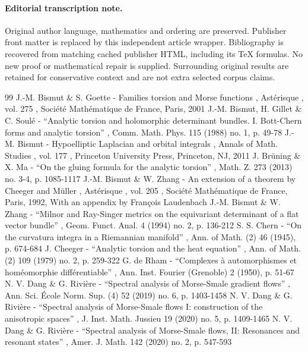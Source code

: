 \documentclass[11pt]{article}
\numberwithin{equation}{section}
\begin{document}
\paragraph{Editorial transcription note.}
Original author language, mathematics and ordering are preserved. Publisher front matter is replaced by this independent article wrapper. Bibliography is recovered from matching cached publisher HTML, including its TeX formulas. No new proof or mathematical repair is supplied. Surrounding original results are retained for conservative context and are not extra selected corpus claims.
\clearpage

\begin{thebibliography}{99}
 J.-M. Bismut \& S. Goette - Families torsion and Morse functions , Astérisque , vol. 275 , Société Mathématique de France, Paris, 2001
 J.-M. Bismut, H. Gillet \& C. Soulé - “Analytic torsion and holomorphic determinant bundles. I. Bott-Chern forms and analytic torsion” , Comm. Math. Phys. 115 (1988) no. 1, p. 49-78
 J.-M. Bismut - Hypoelliptic Laplacian and orbital integrals , Annals of Math. Studies , vol. 177 , Princeton University Press, Princeton, NJ, 2011
 J. Brüning \& X. Ma - “On the gluing formula for the analytic torsion” , Math. Z. 273 (2013) no. 3-4, p. 1085-1117
 J.-M. Bismut \& W. Zhang - An extension of a theorem by Cheeger and Müller , Astérisque , vol. 205 , Société Mathématique de France, Paris, 1992, With an appendix by François Laudenbach
 J.-M. Bismut \& W. Zhang - “Milnor and Ray-Singer metrics on the equivariant determinant of a flat vector bundle” , Geom. Funct. Anal. 4 (1994) no. 2, p. 136-212
 S. S. Chern - “On the curvatura integra in a Riemannian manifold” , Ann. of Math. (2) 46 (1945), p. 674-684
 J. Cheeger - “Analytic torsion and the heat equation” , Ann. of Math. (2) 109 (1979) no. 2, p. 259-322
 G. de Rham - “Complexes à automorphismes et homéomorphie différentiable” , Ann. Inst. Fourier (Grenoble) 2 (1950), p. 51-67
 N. V. Dang \& G. Rivière - “Spectral analysis of Morse-Smale gradient flows” , Ann. Sci. École Norm. Sup. (4) 52 (2019) no. 6, p. 1403-1458
 N. V. Dang \& G. Rivière - “Spectral analysis of Morse-Smale flows I: construction of the anisotropic spaces” , J. Inst. Math. Jussieu 19 (2020) no. 5, p. 1409-1465
 N. V. Dang \& G. Rivière - “Spectral analysis of Morse-Smale flows, II: Resonances and resonant states” , Amer. J. Math. 142 (2020) no. 2, p. 547-593

\end{thebibliography}
\end{document}
